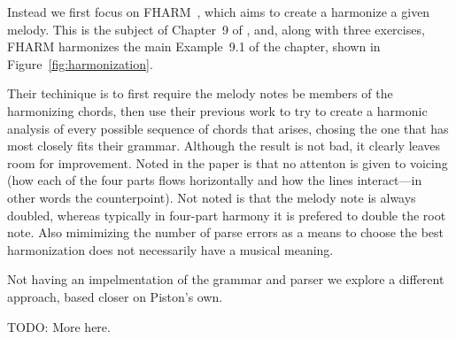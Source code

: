 Instead we first focus on FHARM~\citep{koops-fharm}, which aims to create a
harmonize a given melody. This is the subject of Chapter~9 of
\citet{piston-harmony}, and, along with three exercises,
FHARM harmonizes the main Example~9.1 of the chapter,
shown in Figure~\ref{fig:harmonization}.

\Harmonization

Their techinique is to first require the melody notes be members of
the harmonizing chords, then use their previous work to try to
create a harmonic analysis of every possible sequence of chords that
arises, chosing the one that has most closely fits their
grammar. Although the result is not bad, it clearly leaves room for
improvement. Noted in the paper is that no attenton is given to
voicing (how each of the four parts flows horizontally and how the
lines interact---in other words the counterpoint). Not noted is that
the melody note is always doubled, whereas typically in four-part
harmony it is prefered to double the root note. Also mimimizing the
number of parse errors as a means to choose the best harmonization
does not necessarily have a musical meaning.

Not having an impelmentation of the grammar and parser we explore a
different approach, based closer on Piston's own.

TODO: More here.
